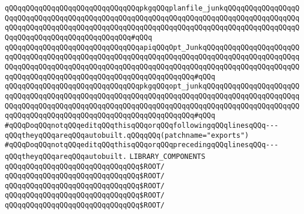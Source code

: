 \verb|qQQqqQQqqQQqqQQqqQQqqQQqqQQqqQQqpkgqQQqplanfile_junkqQQqqQQqqQQqqQQqqQQqqQQqqQQqqQQqqQQqqQQqqQQqqQQqqQQqqQQqqQQqqQQqqQQqqQQqqQQqqQQqqQQqqQQqqQQqqQQqqQQqqQQqqQQqqQQqqQQqqQQqqQQqqQQqqQQqqQQqqQQqqQQqqQQqqQQqqQQqqQQqqQQqqQQqqQQqqQQqqQQqqQQqqQQq#qQQq|\newline
\newline
\verb|qQQqqQQqqQQqqQQqqQQqqQQqqQQqqQQqapiqQQqOpt_JunkqQQqqQQqqQQqqQQqqQQqqQQqqQQqqQQqqQQqqQQqqQQqqQQqqQQqqQQqqQQqqQQqqQQqqQQqqQQqqQQqqQQqqQQqqQQqqQQqqQQqqQQqqQQqqQQqqQQqqQQqqQQqqQQqqQQqqQQqqQQqqQQqqQQqqQQqqQQqqQQqqQQqqQQqqQQqqQQqqQQqqQQqqQQqqQQqqQQqqQQqqQQqqQQq#qQQq|\newline
\verb|qQQqqQQqqQQqqQQqqQQqqQQqqQQqqQQqpkgqQQqopt_junkqQQqqQQqqQQqqQQqqQQqqQQqqQQqqQQqqQQqqQQqqQQqqQQqqQQqqQQqqQQqqQQqqQQqqQQqqQQqqQQqqQQqqQQqqQQqqQQqqQQqqQQqqQQqqQQqqQQqqQQqqQQqqQQqqQQqqQQqqQQqqQQqqQQqqQQqqQQqqQQqqQQqqQQqqQQqqQQqqQQqqQQqqQQqqQQqqQQqqQQqqQQqqQQq#qQQq|\newline
\newline
\verb|#qQQqDoqQQqnotqQQqeditqQQqthisqQQqorqQQqfollowingqQQqlinesqQQq---qQQqtheyqQQqareqQQqautobuilt.qQQqqQQq(patchname="exports")|\newline
\verb|#qQQqDoqQQqnotqQQqeditqQQqthisqQQqorqQQqprecedingqQQqlinesqQQq---qQQqtheyqQQqareqQQqautobuilt.|\newline
\newline
\verb|LIBRARY_COMPONENTS|\newline
\newline
\verb|qQQqqQQqqQQqqQQqqQQqqQQqqQQqqQQq$ROOT/|\newline
\newline
\verb|qQQqqQQqqQQqqQQqqQQqqQQqqQQqqQQq$ROOT/|\newline
\verb|qQQqqQQqqQQqqQQqqQQqqQQqqQQqqQQq$ROOT/|\newline
\verb|qQQqqQQqqQQqqQQqqQQqqQQqqQQqqQQq$ROOT/|\newline
\verb|qQQqqQQqqQQqqQQqqQQqqQQqqQQqqQQq$ROOT/|\newline
